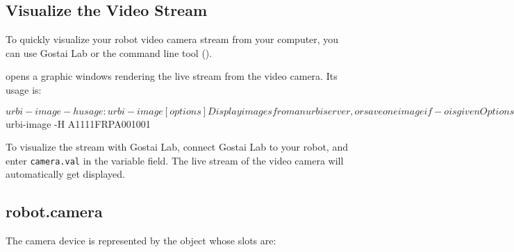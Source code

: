\subsection{Visualize the Video Stream}

To quickly visualize your robot video camera stream from your computer, you
can use Gostai Lab or the command line tool 
().

 opens a graphic windows rendering the live stream from
the video camera. Its usage is:

\begin{shell}
$ urbi-image -h
usage: urbi-image [options]
Display images from an urbi server, or save one image if -o is given

Options:
  -h, --help                   display this message and exit successfully
      --version                display version information
  -H, --host=HOST              address to connect to
  -P, --port=PORT              port to connect to
      --port-file=FILE         read port number in FILE
  -p, --period=PERIOD          query images at given period (in milliseconds)
  -F, --format=FORMAT          select format of the image (rgb, ycrcb, jpeg, ppm)
  -r, --reconstruct            use reconstruct mode (for aibo)
  -j, --jpeg=FACTOR            jpeg compression factor (from 0 to 100, def 70)
  -d, --device=DEVICE          query image on DEVICE.val (default: camera)
  -o, --output=FILE            query and save one image to FILE
  -R, --resolution=RESOLUTION  select resolution of the image (0=biggest)
  -s, --scale=FACTOR           rescale image with given FACTOR (display only)

transfer Format : jpeg=transfer jpeg, raw=transfer raw
save     Format : rgb , ycrcb, jpeg, ppm
$ urbi-image -H A1111FRPA001001
\end{shell}%

To visualize the stream with Gostai Lab, connect Gostai Lab to your robot, and
enter \lstinline{camera.val} in the variable field. The live stream of the
video camera will automatically get displayed.

\subsection{robot.camera}

The camera device is represented by the \us object whose slots are:

